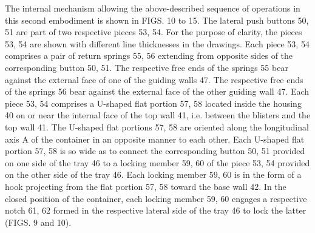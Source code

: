 \documentclass[11pt,a4paper]{article}
\begin{document}
The internal mechanism allowing the above-described sequence of operations in this second embodiment is shown in FIGS. 10 to 15. The lateral push buttons 50, 51 are part of two respective pieces 53, 54. For the purpose of clarity, the pieces 53, 54 are shown with different line thicknesses in the drawings. Each piece 53, 54 comprises a pair of return springs 55, 56 extending from opposite sides of the corresponding button 50, 51. The respective free ends of the springs 55 bear against the external face of one of the guiding walls 47. The respective free ends of the springs 56 bear against the external face of the other guiding wall 47. Each piece 53, 54 comprises a U-shaped flat portion 57, 58 located inside the housing 40 on or near the internal face of the top wall 41, i.e. between the blisters and the top wall 41. The U-shaped flat portions 57, 58 are oriented along the longitudinal axis A of the container in an opposite manner to each other. Each U-shaped flat portion 57, 58 is so wide as to connect the corresponding button 50, 51 provided on one side of the tray 46 to a locking member 59, 60 of the piece 53, 54 provided on the other side of the tray 46. Each locking member 59, 60 is in the form of a hook projecting from the flat portion 57, 58 toward the base wall 42. In the closed position of the container, each locking member 59, 60 engages a respective notch 61, 62 formed in the respective lateral side of the tray 46 to lock the latter (FIGS. 9 and 10).
\end{document}
